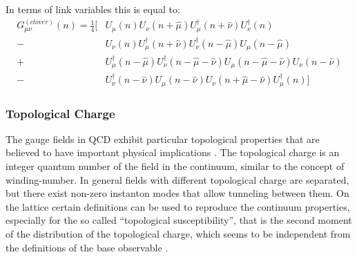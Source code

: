 In terms of link variables this is equal to:
\begin{align}
    G_{\mu\nu}^{(clover)}(n)=\frac{1}{4}\bigg[  &U_\mu(n)U_\nu(n+\hat\mu)U^\dagger_\mu(n+\hat\nu)U^\dagger_\nu(n)\\\nonumber
    - &U_\nu(n)U^\dagger_\mu(n+\hat\nu)U^\dagger_\nu(n-\hat\mu)U_\mu(n-\hat\mu)\\\nonumber
    + &U^\dagger_\mu(n-\hat\mu)U^\dagger_\nu(n-\hat\mu-\hat\nu)U_\mu(n-\hat\mu-\hat\nu)U_\nu(n-\hat\nu)\\\nonumber
    - &U^\dagger_\nu(n-\hat\nu)U_\mu(n-\hat\nu)U_\nu(n+\hat\mu-\hat\nu)U^\dagger_\mu(n) \bigg]
\end{align}
 

\subsubsection{Topological Charge}
The gauge fields in QCD exhibit particular topological properties that are believed to have important physical implications \cite{witten_current_1979}\cite{di_giacomo_topology_1997}. The topological charge is an integer quantum number of the field in the continuum, similar to the concept of winding-number. In general fields with different topological charge are separated, but there exist non-zero instanton modes \cite{schafer_instantons_1998} that allow tunneling between them.
On the lattice certain definitions can be used to reproduce the continuum properties, especially for the so called ``topological susceptibility'', that is the second moment of the distribution of the topological charge, which seems to be independent from the definitions of the base observable \cite{alexandrou_comparison_2017}\cite{gross_qcd_1981}. 



